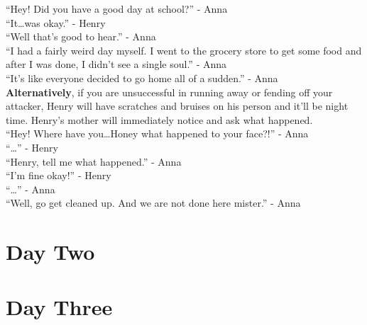 \documentclass[12pt, a4paper, titlepage]{article}
\begin{document}
            ``Hey! Did you have a good day at school?'' - Anna
            \\

            ``It\dots was okay.'' - Henry
            \\

            ``Well that's good to hear.'' - Anna
            \\

            ``I had a fairly weird day myself. I went to the grocery store to get some food and after I was done, I didn't see a single soul.'' - Anna
            \\

            ``It's like everyone decided to go home all of a sudden.'' - Anna
            \\

            \textbf{Alternatively}, if you are unsuccessful in running away or fending off your attacker, Henry will have 
            scratches and bruises on his person and it'll be night time. Henry's mother will immediately notice and ask what happened.
            \\

            ``Hey! Where have you\ldots Honey what happened to your face?!'' - Anna
            \\

            ``\ldots'' - Henry
            \\

            ``Henry, tell me what happened.'' - Anna
            \\

            ``I'm fine okay!'' - Henry
            \\

            ``\ldots'' - Anna
            \\

            ``Well, go get cleaned up. And we are not done here mister.'' - Anna

            

    \section{Day Two}
    
    \section{Day Three}
\end{document}
